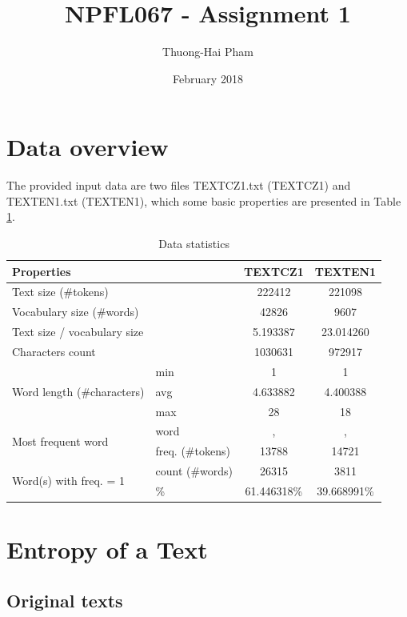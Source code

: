 \documentclass{article}
\title{NPFL067 - Assignment 1}
\author{Thuong-Hai Pham}
\date{February 2018}
\begin{document}
\maketitle

\section{Data overview}

The provided input data are two files TEXTCZ1.txt (TEXTCZ1) and TEXTEN1.txt (TEXTEN1), which some basic properties are presented in Table \ref{table:data_stats}.

\begin{table}[h]
\centering
\begin{tabular}{| l | l | c | c |} 
 \hline
 \multicolumn{2}{|l|}{Properties} & TEXTCZ1 & TEXTEN1 \\
 \hline
 \multicolumn{2}{|l|}{Text size (\#tokens)} & 222412 & 221098 \\
 \multicolumn{2}{|l|}{Vocabulary size (\#words)} & 42826 & 9607 \\
 \multicolumn{2}{|l|}{Text size / vocabulary size} & 5.193387 & 23.014260 \\
 \multicolumn{2}{|l|}{Characters count} & 1030631 & 972917 \\
 \hline
 \multirow{3}{12em}{Word length (\#characters)} & min & 1 & 1 \\
 & avg & 4.633882 & 4.400388 \\
 & max & 28 & 18 \\
 \hline
 \multirow{2}{12em}{Most frequent word} & word & , & , \\
 & freq. (\#tokens) & 13788 & 14721 \\
 \hline
 \multirow{2}{12em}{Word(s) with freq. = 1} & count (\#words) & 26315 & 3811 \\
 & \% & 61.446318\% & 39.668991\% \\
 \hline
\end{tabular}
\caption{Data statistics}
\label{table:data_stats}
\end{table}

\section{Entropy of a Text}

\subsection{Original texts}
\end{document}
